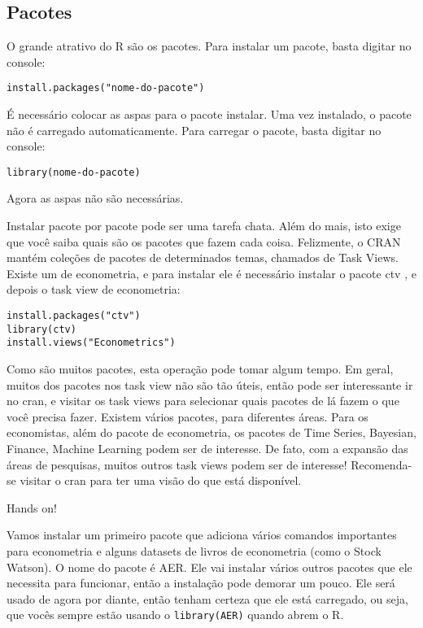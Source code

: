 \documentclass[
]{book}
\begin{document}
\hypertarget{pacotes}{%
\subsection{Pacotes}\label{pacotes}}

O grande atrativo do R são os pacotes. Para instalar um pacote, basta digitar no console:

\begin{verbatim}
install.packages("nome-do-pacote")
\end{verbatim}

É necessário colocar as aspas para o pacote instalar. Uma vez instalado, o pacote não é carregado automaticamente. Para carregar o pacote, basta digitar no console:

\begin{verbatim}
library(nome-do-pacote)
\end{verbatim}

Agora as aspas não são necessárias.

Instalar pacote por pacote pode ser uma tarefa chata. Além do mais, isto exige que você saiba quais são os pacotes que fazem cada coisa. Felizmente, o CRAN mantém coleções de pacotes de determinados temas, chamados de Task Views. Existe um de econometria, e para instalar ele é necessário instalar o pacote ctv , e depois o task view de econometria:

\begin{verbatim}
install.packages("ctv")
library(ctv)
install.views("Econometrics")
\end{verbatim}

Como são muitos pacotes, esta operação pode tomar algum tempo. Em geral, muitos dos pacotes nos task view não são tão úteis, então pode ser interessante ir no cran, e visitar os task views para selecionar quais pacotes de lá fazem o que você precisa fazer. Existem vários pacotes, para diferentes áreas. Para os economistas, além do pacote de econometria, os pacotes de Time Series, Bayesian, Finance, Machine Learning podem ser de interesse. De fato, com a expansão das áreas de pesquisas, muitos outros task views podem ser de interesse! Recomenda-se visitar o cran para ter uma visão do que está disponível.

Hands on!

Vamos instalar um primeiro pacote que adiciona vários comandos importantes para econometria e alguns datasets de livros de econometria (como o Stock Watson). O nome do pacote é AER. Ele vai instalar vários outros pacotes que ele necessita para funcionar, então a instalação pode demorar um pouco. Ele será usado de agora por diante, então tenham certeza que ele está carregado, ou seja, que vocês sempre estão usando o \texttt{library(AER)} quando abrem o R.
\end{document}
